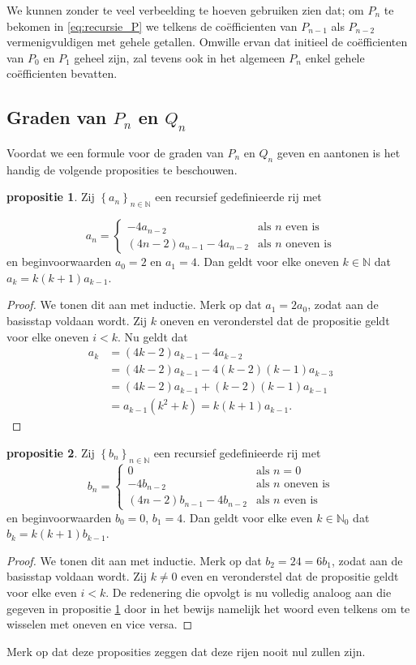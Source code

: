 \documentclass[12pt,a4paper]{article}
\theoremstyle{definition}
\numberwithin{equation}{section}
\begin{document}
We kunnen zonder te veel verbeelding te hoeven gebruiken zien dat; om $P_n$ te bekomen in \eqref{eq:recursie_P} we telkens de coëfficienten van $P_{n-1}$ als $P_{n-2}$ vermenigvuldigen met gehele getallen. Omwille ervan dat initieel de coëfficienten van $P_0$ en $P_1$ geheel zijn, zal tevens ook in het algemeen $P_n$ enkel gehele coëfficienten bevatten.

\subsection*{Graden van $P_n$ en $Q_n$}
Voordat we een formule voor de graden van $P_n$ en $Q_n$ geven en aantonen is het handig de volgende proposities te beschouwen.
\newtheorem{propositie}{propositie}\label{thm:prop1}
\begin{propositie} Zij  $\left\{a_n\right\}_{n\in\mathbb{N}}$ een recursief gedefinieerde rij met

$$a_n=
\begin{cases}
  -4 a_{n-2} & \text{als $n$ even is}\\
  \left(4n-2\right)a_{n-1} - 4a_{n-2} & \text{als $n$ oneven is}
\end{cases}$$
en beginvoorwaarden $a_0=2$ en $a_1=4$. Dan geldt voor elke oneven $k\in\mathbb{N}$ dat $a_k = k(k+1)a_{k-1}$.
\end{propositie}
\begin{proof}
  We tonen dit aan met inductie. Merk op dat $a_1 = 2a_0$, zodat aan de basisstap voldaan wordt. 
  Zij $k$ oneven en veronderstel dat de propositie geldt voor elke oneven $i<k$.
  Nu geldt dat
  \begin{align*}
    a_k &= (4k-2)a_{k-1} - 4a_{k-2}\\
        &= (4k-2)a_{k-1} - 4(k-2)(k-1)a_{k-3}\\
        &= (4k-2)a_{k-1}+(k-2)(k-1)a_{k-1}\\
        &=a_{k-1}(k^2 + k) = k(k+1)a_{k-1}.
  \end{align*}
\end{proof}


\label{thm:prop2}
\begin{propositie} Zij $\left\{b_n\right\}_{n\in\mathbb{N}}$ een recursief gedefinieerde rij met
$$b_n=
\begin{cases}
 0 & \text{als $n=0$} \\
  -4 b_{n-2} & \text{als $n$ oneven is}\\
  \left(4n-2\right)b_{n-1} - 4b_{n-2} & \text{als $n$ even is}
\end{cases}$$
en beginvoorwaarden $b_0=0$, $b_1=4$. Dan geldt voor elke even $k\in\mathbb{N}_0$ dat $b_k = k(k+1)b_{k-1}$.
\end{propositie}
\begin{proof}
  We tonen dit aan met inductie. Merk op dat $b_2 =24= 6b_1$, zodat aan de basisstap voldaan wordt.  
  Zij $k\neq 0$ even en veronderstel dat de propositie geldt voor elke even $i<k$. De redenering die opvolgt is nu volledig analoog aan die gegeven in propositie \hyperref[thm:prop2]{1} door in het bewijs namelijk het woord even telkens om te wisselen met oneven en vice versa.
\end{proof}
Merk op dat deze proposities zeggen dat deze rijen nooit nul zullen zijn.
\end{document}
